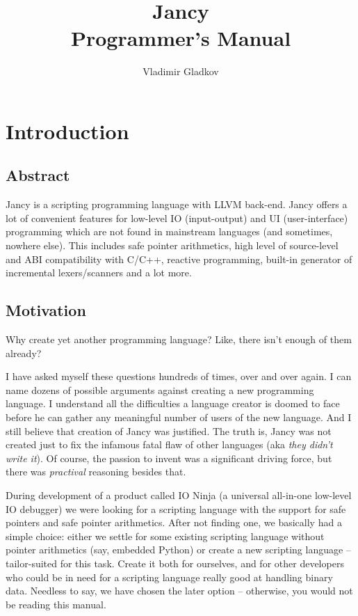 \documentclass[oneside]{book}
\title{Jancy\\Programmer's Manual}
\author{Vladimir Gladkov}
\begin{document}
\maketitle
\thispagestyle{empty}
\newpage
\tableofcontents

\chapter{Introduction}

\section{Abstract}

Jancy is a scripting programming language with LLVM back-end. Jancy offers a lot of convenient features for low-level IO (input-output) and UI (user-interface) programming which are not found in mainstream languages (and sometimes, nowhere else). This includes safe pointer arithmetics, high level of source-level and ABI compatibility with C/C++, reactive programming, built-in generator of incremental lexers/scanners and a lot more.

\section{Motivation}

Why create yet another programming language? Like, there isn't enough of them already?

I have asked myself these questions hundreds of times, over and over again. I can name dozens of possible arguments against creating a new programming language. I understand all the difficulties a language creator is doomed to face before he can gather any meaningful number of users of the new language. And I still believe that creation of Jancy was justified. The truth is, Jancy was not created just to fix the infamous fatal flaw of other languages (aka \emph{they didn't write it}). Of course, the passion to invent was a significant driving force, but there was \emph{practival} reasoning besides that. 

During development of a product called IO Ninja (a universal all-in-one low-level IO debugger) we were looking for a scripting language with the support for safe pointers and safe pointer arithmetics. After not finding one, we basically had a simple choice: either we settle for some existing scripting language without pointer arithmetics (say, embedded Python) or create a new scripting language -- tailor-suited for this task. Create it both for ourselves, and for other developers who could be in need for a scripting language really good at handling binary data. Needless to say, we have chosen the later option -- otherwise, you would not be reading this manual.
\end{document}
